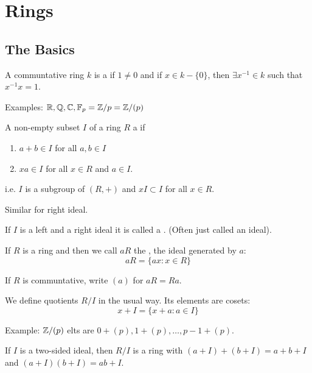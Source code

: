 \chapter{Rings}

\section{The Basics}

  \begin{define}
    A communtative ring $k$ is a  if $1 \neq 0$ and if
    $x\in k-\{0\}$, then $\exists x^{-1} \in k$ such that $x^{-1}x=1$.
  \end{define}

  Examples: $\mathbb{R}, \mathbb{Q}, \mathbb{C}, \mathbb{F}_p = \mathbb{Z}/p = \mathbb{Z}/(p)$

  \begin{define}
    A non-empty subset $I$ of a ring $R$ a  if
    \begin{enumerate}
      \item $a+b \in I$ for all $a,b \in I$
      \item $xa \in I$ for all $x \in R$ and $a \in I$.
    \end{enumerate}
  \end{define}

  i.e. $I$ is a subgroup of $(R, +)$ and $xI \subset I$ for all $x \in R$.

  Similar for right ideal.

  \begin{define}
    If $I$ is a left and a right ideal it is called a .
    (Often just called an ideal).
  \end{define}

  \begin{define}
    If $R$ is a ring and then we call $aR$ the , the
    ideal generated by $a$:
    \[ aR = \{ ax : x \in R\} \]
  \end{define}

  If $R$ is communtative, write $(a)$ for $aR = Ra$.

  \begin{define}
    We define quotients $R/I$ in the usual way. Its elements are cosets:
    \[ x + I = \{ x + a : a \in I \} \]
  \end{define}

  Example: $\mathbb{Z}/(p)$ elts are $0 + (p), 1 + (p), \ldots, p-1 + (p)$.

  \begin{lemma}
    If $I$ is a two-sided ideal, then $R/I$ is a ring with
    $(a+I) + (b+I) = a+b+I$ and $(a+I)(b+I) = ab + I$.
  \end{lemma}

